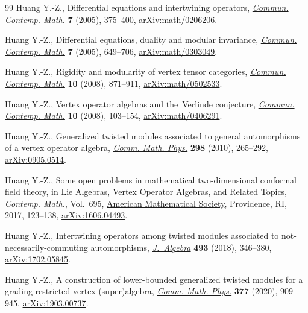 \begin{thebibliography}{99}
Huang Y.-Z., Differential equations and intertwining operators,
 \href{https://doi.org/10.1142/S0219199705001799}{\textit{Commun. Contemp.
 Math.}} \textbf{7} (2005), 375--400,
 \href{https://arxiv.org/abs/math/0206206}{arXiv:math/0206206}.

Huang Y.-Z., Differential equations, duality and modular invariance,
 \href{https://doi.org/10.1142/S021919970500191X}{\textit{Commun. Contemp.
 Math.}} \textbf{7} (2005), 649--706,
 \href{https://arxiv.org/abs/math/0303049}{arXiv:math/0303049}.

Huang Y.-Z., Rigidity and modularity of vertex tensor categories,
 \href{https://doi.org/10.1142/S0219199708003083}{\textit{Commun. Contemp.
 Math.}} \textbf{10} (2008), 871--911,
 \href{https://arxiv.org/abs/math/0502533}{arXiv:math/0502533}.

Huang Y.-Z., Vertex operator algebras and the~{V}erlinde conjecture,
 \href{https://doi.org/10.1142/S0219199708002727}{\textit{Commun. Contemp.
 Math.}} \textbf{10} (2008), 103--154,
 \href{https://arxiv.org/abs/math/0406291}{arXiv:math/0406291}.

Huang Y.-Z., Generalized twisted modules associated to general automorphisms of
 a vertex operator algebra,
 \href{https://doi.org/10.1007/s00220-010-0999-6}{\textit{Comm. Math. Phys.}}
 \textbf{298} (2010), 265--292,
 \href{https://arxiv.org/abs/0905.0514}{arXiv:0905.0514}.

Huang Y.-Z., Some open problems in mathematical two-dimensional conformal field
 theory, in Lie {A}lgebras, {V}ertex {O}perator {A}lgebras, and {R}elated
 {T}opics, \textit{Contemp. Math.}, Vol.~695,
 \href{https://doi.org/10.1090/conm/695/13999}{American Mathematical Society},
 Providence, RI, 2017, 123--138,
 \href{https://arxiv.org/abs/1606.04493}{arXiv:1606.04493}.

Huang Y.-Z., Intertwining operators among twisted modules associated to
 not-necessarily-commuting automorphisms,
 \href{https://doi.org/10.1016/j.jalgebra.2017.09.029}{\textit{J.~Algebra}}
 \textbf{493} (2018), 346--380,
 \href{https://arxiv.org/abs/1702.05845}{arXiv:1702.05845}.

Huang Y.-Z., A construction of lower-bounded generalized twisted modules for a
 grading-restricted vertex (super)algebra,
 \href{https://doi.org/10.1007/s00220-019-03582-6}{\textit{Comm. Math. Phys.}}
 \textbf{377} (2020), 909--945,
 \href{https://arxiv.org/abs/1903.00737}{arXiv:1903.00737}.


\end{thebibliography}

